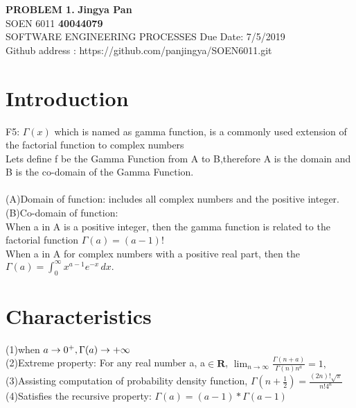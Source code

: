 \documentclass[a4paper, 11pt]{article}
\begin{document}
\noindent
\large\textbf{PROBLEM 1.} \hfill \textbf{Jingya Pan} \\
\normalsize SOEN 6011 \hfill \textbf{40044079} \\
 SOFTWARE ENGINEERING PROCESSES \hfill Due Date: 7/5/2019 \\
\hfill Github address : https://github.com/panjingya/SOEN6011.git

\section{Introduction}

F5: $\Gamma \left( x \right)$ which is named as gamma function, is a commonly used extension of the factorial function to complex numbers\\

Lets define f be the Gamma Function from A to B,therefore A is the domain and B is the  co-domain of the Gamma Function.\\ \\
\indent(A)Domain of function: includes all complex numbers and the positive integer.\\

(B)Co-domain of function: \\
\indent\indent\indent When a in A is a positive integer, then the gamma function is related to the factorial function  $\Gamma(a) = (a-1)!$ \\
\indent\indent\indent When a in A for complex numbers with a positive real part, then the ${\displaystyle \Gamma (a)=\int _{0}^{\infty }x^{a-1}e^{-x}\,dx.}$

\section{Characteristics}
\indent\indent (1)when ${\displaystyle} a\to 0^+, {\displaystyle} \Gamma(a)\to+\infty$ \\

\indent (2)Extreme property: For any real number a,  a$\in\mathbf{R}$, $\lim_{n\to\infty} \frac{\Gamma(n+a)}{\Gamma(n)n^{a}} = 1, $ \\

\indent (3)Assisting computation of probability density function, ${\displaystyle \Gamma \left(n+{\tfrac {1}{2}}\right)={\frac {(2n)!{\sqrt {\pi }}}{n!4^{n}}}}$ \\

\indent(4)Satisfies the recursive property: $\Gamma(a)=(a-1)*\Gamma(a-1)$
\end{document}
